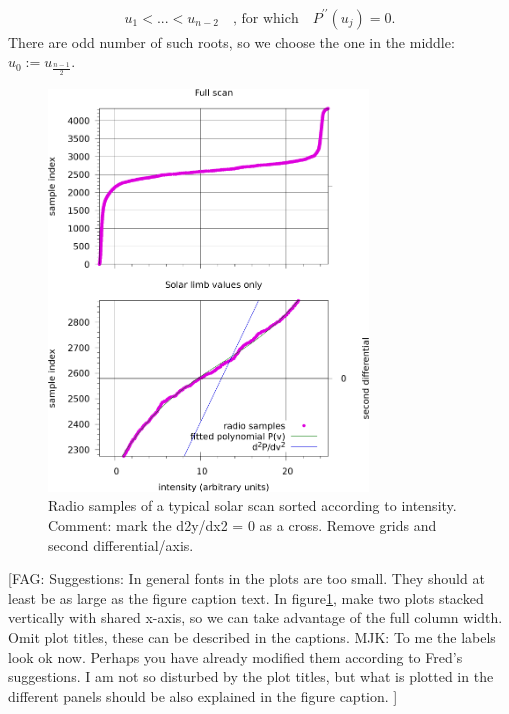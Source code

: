 \documentclass{aa}
\newcommand{\fag}[1]{\textcolor{midpurple}{[FAG: #1]}} %
\newcommand{\eqnl}[2]{\begin{eqnarray}\label{#1}#2\end{eqnarray}}
\begin{document}
\eqnl{scurve-roots}{
u_1 < ... < u_{n-2} \quad \text{, for which} \quad P^{\prime\prime}(u_j) = 0 \text{.}
}
There are odd number of such roots, so we choose the one in the middle: $u_0 := u_{\frac{n-1}{2}}$.
\begin{figure}
\centering
\includegraphics[width=8.5cm]{Scurve_example.png}
\caption{Radio samples of a typical solar scan sorted according to intensity. Comment: mark the d2y/dx2 = 0 as a cross. 
Remove grids and second differential/axis.}
\label{S-curve_example}
\end{figure}

\fag{Suggestions: In general fonts in the plots are too small. They should at least be as large as the figure caption text. In figure\ref{S-curve_example}, make two plots stacked vertically with shared x-axis, so we can take advantage of the full column width.
Omit plot titles, these can be described in the captions. MJK: To me the labels look ok now. Perhaps you have already modified them according to Fred's suggestions. I am not so disturbed by the plot titles, but what is plotted in the different panels should be also explained in the figure caption. }
\end{document}
